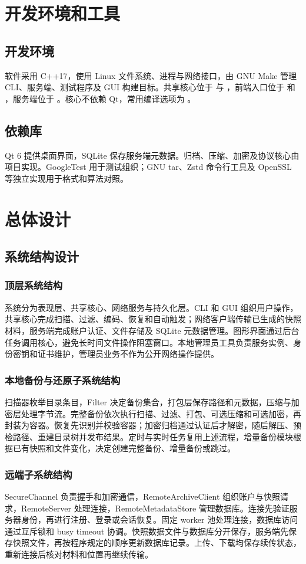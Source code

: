 \section{开发环境和工具}
\subsection{开发环境}
软件采用 C++17，使用 Linux 文件系统、进程与网络接口，由 GNU Make 管理 CLI、服务端、测试程序及 GUI 构建目标。共享核心位于  与 ，前端入口位于  和 ，服务端位于 。核心不依赖 Qt，常用编译选项为 。
\subsection{依赖库}
Qt 6 提供桌面界面，SQLite 保存服务端元数据。归档、压缩、加密及协议核心由项目实现。GoogleTest 用于测试组织；GNU tar、Zstd 命令行工具及 OpenSSL 等独立实现用于格式和算法对照。

\section{总体设计}
\subsection{系统结构设计}
\subsubsection{顶层系统结构}
系统分为表现层、共享核心、网络服务与持久化层。CLI 和 GUI 组织用户操作，共享核心完成扫描、过滤、编码、恢复和自动触发；网络客户端传输已生成的快照材料，服务端完成账户认证、文件存储及 SQLite 元数据管理。图形界面通过后台任务调用核心，避免长时间文件操作阻塞窗口。本地管理员工具负责服务实例、身份密钥和证书维护，管理员业务不作为公开网络操作提供。

\subsubsection{本地备份与还原子系统结构}
扫描器枚举目录条目，Filter 决定备份集合，打包层保存路径和元数据，压缩与加密层处理字节流。完整备份依次执行扫描、过滤、打包、可选压缩和可选加密，再封装为容器。恢复先识别并校验容器；加密归档通过认证后才解密，随后解压、预检路径、重建目录树并发布结果。定时与实时任务复用上述流程，增量备份模块根据已有快照和文件变化，决定创建完整备份、增量备份或跳过。

\subsubsection{远端子系统结构}
SecureChannel 负责握手和加密通信，RemoteArchiveClient 组织账户与快照请求，RemoteServer 处理连接，RemoteMetadataStore 管理数据库。连接先验证服务器身份，再进行注册、登录或会话恢复。固定 worker 池处理连接，数据库访问通过互斥锁和 busy timeout 协调。快照数据文件与数据库分开保存，服务端先保存快照文件，再按程序规定的顺序更新数据库记录。上传、下载均保存续传状态，重新连接后核对材料和位置再继续传输。

